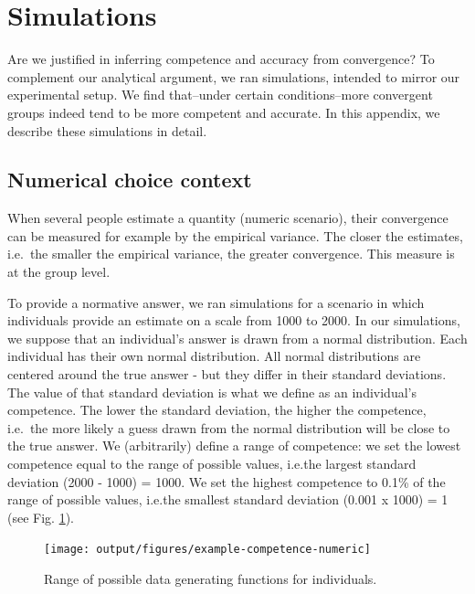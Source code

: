 \documentclass[
  doc,floatsintext]{apa6}
\begin{document}
\clearpage
\newpage

\section{Simulations}\label{simulations}

Are we justified in inferring competence and accuracy from convergence? To complement our analytical argument, we ran simulations, intended to mirror our experimental setup. We find that--under certain conditions--more convergent groups indeed tend to be more competent and accurate. In this appendix, we describe these simulations in detail.

\subsection{Numerical choice context}\label{numerical-choice-context}

When several people estimate a quantity (numeric scenario), their convergence can be measured for example by the empirical variance. The closer the estimates, i.e.~the smaller the empirical variance, the greater convergence. This measure is at the group level.

To provide a normative answer, we ran simulations for a scenario in which individuals provide an estimate on a scale from 1000 to 2000. In our simulations, we suppose that an individual's answer is drawn from a normal distribution. Each individual has their own normal distribution. All normal distributions are centered around the true answer - but they differ in their standard deviations. The value of that standard deviation is what we define as an individual's competence. The lower the standard deviation, the higher the competence, i.e.~the more likely a guess drawn from the normal distribution will be close to the true answer. We (arbitrarily) define a range of competence: we set the lowest competence equal to the range of possible values, i.e.the largest standard deviation (2000 - 1000) = 1000. We set the highest competence to 0.1\% of the range of possible values, i.e.the smallest standard deviation (0.001 x 1000) = 1 (see Fig. \ref{fig:example-competence-numeric}).



\begin{figure}
\texttt{[image: output/figures/example-competence-numeric]} \caption{Range of possible data generating functions for individuals.}\label{fig:example-competence-numeric}
\end{figure}
\end{document}
